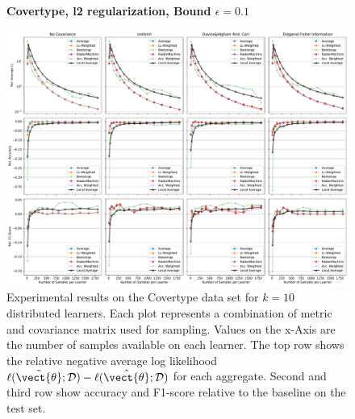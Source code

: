     \begin{landscape}
        \begin{figure}
            \centering
            \textbf{Covertype, l2 regularization, Bound $\epsilon=0.1$}\par\medskip
            \includegraphics[height=\dimexpr \textheight - 4\baselineskip\relax]{kapitel/figures/covertype_l2_0.1_neg_relative.pdf}
            \caption[Covertype plots with l2 regularization and $\epsilon=0.1$]{Experimental results on the Covertype data set for $k=10$ distributed learners. Each plot represents a combination of metric and covariance matrix used for sampling. Values on the x-Axis are the number of samples available on each learner. The top row shows the relative negative average log likelihood $\ell(\tilde{\vect{\theta}}; \mathcal{D}) - \ell(\hat{\vect{\theta}}; \mathcal{D})$ for each aggregate. Second and third row show accuracy and F1-score relative to the baseline on the test set.}
            \label{fig:analysis9}
        \end{figure}
    \end{landscape}

